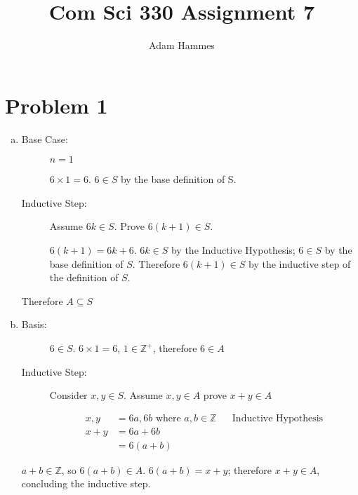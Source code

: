 \documentclass[11pt]{article}
\begin{document}
\let\iff\leftrightarrow

\title{Com Sci 330 Assignment 7}
\author{Adam Hammes}
\maketitle

\section*{Problem 1}
	\begin{enumerate}[(a)]

	\item \begin{description}
			
		\item[Base Case:] $n=1$
		
		$6 \times 1 = 6$. $6 \in S$ by the base definition of S.
	
		\item[Inductive Step:]
		Assume $6k \in S$. Prove $6(k+1) \in S$.
		
		$6(k + 1) = 6k + 6$. $6k \in S $ by the Inductive Hypothesis; $6 \in S
		$ by the base definition of $S$. Therefore $6(k+1) \in S$ by the
		inductive step of the definition of $S$.
	

	\end{description}
	
	Therefore $A \subseteq S$
	
	\item \begin{description}
		\item[Basis:] $6 \in S$. $6 \times 1 = 6$, $1 \in \mathbb{Z}^+$, 					therefore $6 \in A$
		
		\item[Inductive Step:] Consider $x, y \in S$. Assume $x, y \in A$ prove
		$x + y \in A $
		
		\begin{align*}
		x, y &= 6a, 6b \text{ where } a, b \in \mathbb{Z} && \text{Inductive 
		Hypothesis} \\		
		x + y &= 6a + 6b \\
		&= 6( a + b )
		\end{align*}
			 
	\end{description}
	
	$a+b \in \mathbb{Z}$, so $6(a+b) \in A$. $6(a+b) = x + y$; therefore $x+y 
	\in A $, concluding the inductive step.
	\end{enumerate}
\end{document}
